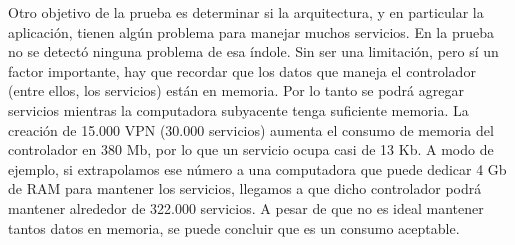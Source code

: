 
Otro objetivo de la prueba es determinar si la arquitectura, y en particular la aplicación, tienen algún problema para manejar muchos servicios. En la prueba no se detectó ninguna problema de esa índole. Sin ser una limitación, pero sí un factor importante, hay que recordar que los datos que maneja el controlador (entre ellos, los servicios) están en memoria. Por lo tanto se podrá agregar servicios mientras la computadora subyacente tenga suficiente memoria. La creación de 15.000 VPN (30.000 servicios) aumenta el consumo de memoria del controlador en 380 Mb, por lo que un servicio ocupa casi de 13 Kb. A modo de ejemplo, si extrapolamos ese número a una computadora que puede dedicar 4 Gb de RAM para mantener los servicios, llegamos a que dicho controlador podrá mantener alrededor de 322.000 servicios. A pesar de que no es ideal mantener tantos datos en memoria, se puede concluir que es un consumo aceptable. \\

